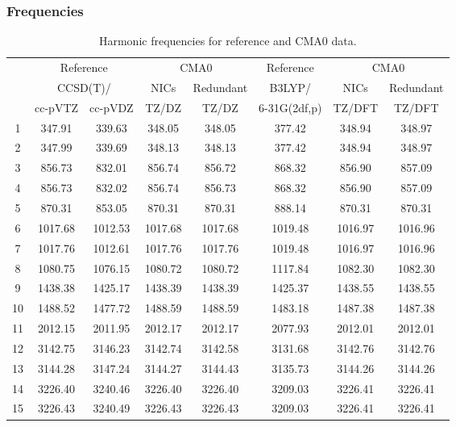 \documentclass[10pt,oneside]{article}
\begin{document}
\begin{table}[h!]
\subsubsection*{Frequencies}
\centering
\caption{Harmonic frequencies for reference and CMA0 data.}
\begin{tabular}{cccccccc}
\toprule
{} & \multicolumn{2}{c}{Reference} & \multicolumn{2}{c}{CMA0} &    Reference & \multicolumn{2}{c}{CMA0} \\
{} & \multicolumn{2}{c}{CCSD(T)/} &    NICs &  Redundant &       B3LYP/ &    NICs & Redundant \\
{} &   cc-pVTZ & cc-pVDZ &   TZ/DZ &      TZ/DZ & 6-31G(2df,p) &  TZ/DFT &    TZ/DFT \\
\midrule
1  &    347.91 &  339.63 &  348.05 &     348.05 &       377.42 &  348.94 &    348.97 \\
2  &    347.99 &  339.69 &  348.13 &     348.13 &       377.42 &  348.94 &    348.97 \\
3  &    856.73 &  832.01 &  856.74 &     856.72 &       868.32 &  856.90 &    857.09 \\
4  &    856.73 &  832.02 &  856.74 &     856.73 &       868.32 &  856.90 &    857.09 \\
5  &    870.31 &  853.05 &  870.31 &     870.31 &       888.14 &  870.31 &    870.31 \\
6  &   1017.68 & 1012.53 & 1017.68 &    1017.68 &      1019.48 & 1016.97 &   1016.96 \\
7  &   1017.76 & 1012.61 & 1017.76 &    1017.76 &      1019.48 & 1016.97 &   1016.96 \\
8  &   1080.75 & 1076.15 & 1080.72 &    1080.72 &      1117.84 & 1082.30 &   1082.30 \\
9  &   1438.38 & 1425.17 & 1438.39 &    1438.39 &      1425.37 & 1438.55 &   1438.55 \\
10 &   1488.52 & 1477.72 & 1488.59 &    1488.59 &      1483.18 & 1487.38 &   1487.38 \\
11 &   2012.15 & 2011.95 & 2012.17 &    2012.17 &      2077.93 & 2012.01 &   2012.01 \\
12 &   3142.75 & 3146.23 & 3142.74 &    3142.58 &      3131.68 & 3142.76 &   3142.76 \\
13 &   3144.28 & 3147.24 & 3144.27 &    3144.43 &      3135.73 & 3144.26 &   3144.26 \\
14 &   3226.40 & 3240.46 & 3226.40 &    3226.40 &      3209.03 & 3226.41 &   3226.41 \\
15 &   3226.43 & 3240.49 & 3226.43 &    3226.43 &      3209.03 & 3226.41 &   3226.41 \\
\bottomrule
\end{tabular}
\end{table}
\end{document}
